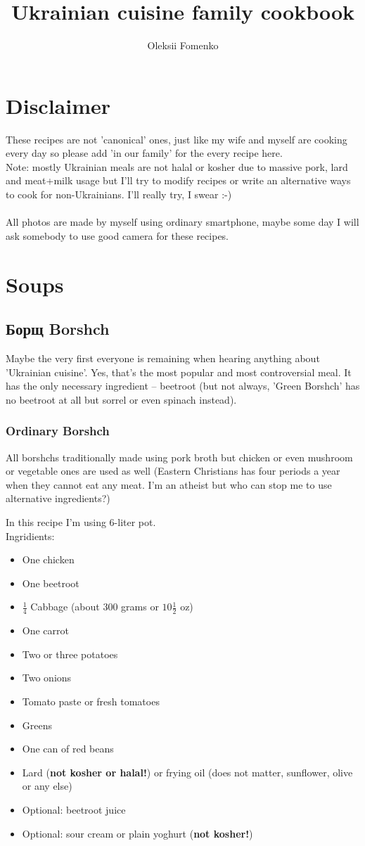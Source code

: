 \documentclass[11pt,a4paper]{article}
\title{\textbf{Ukrainian cuisine family cookbook}}
\author{Oleksii Fomenko}
\date{}
\begin{document}
\section*{Disclaimer}
These recipes are not 'canonical' ones, just like my wife and myself are cooking every day so please add 'in our family' for the every recipe here.
\\

Note: mostly Ukrainian meals are not halal or kosher due to massive pork, lard and meat+milk usage but I'll try to modify recipes or write an alternative ways to cook for non-Ukrainians. I'll really try, I swear :-)
\\
\\
All photos are made by myself using ordinary smartphone, maybe some day I will ask somebody to use good camera for these recipes.
\\

\section*{Soups}
\subsection*{Борщ Borshch \textipa{['bO:rS]}}
Maybe the very first everyone is remaining when hearing anything about 'Ukrainian cuisine'.
Yes, that's the most popular and most controversial meal. It has the only necessary ingredient -- beetroot (but not always, 'Green Borshch' has no beetroot at all but sorrel or even spinach instead).

\subsubsection*{Ordinary Borshch}
All borshchs traditionally made using pork broth but chicken or even mushroom or vegetable ones are used as well (Eastern Christians has four periods a year when they cannot eat any meat. I'm an atheist but who can stop me to use alternative ingredients?)

In this recipe I'm using 6-liter pot. \\

Ingridients:
\begin{itemize}
  \item One chicken
  \item One beetroot
  \item $\frac{1}{4}$ Cabbage (about 300 grams or $10\frac{1}{2}$ oz) 
  \item One carrot
  \item Two or three potatoes
  \item Two onions
  \item Tomato paste or fresh tomatoes
  \item Greens
  \item One can of red beans
  \item Lard (\textbf{not kosher or halal!}) or frying oil (does not matter, sunflower, olive or any else)
  \item Optional: beetroot juice
  \item Optional: sour cream or plain yoghurt (\textbf{not kosher!})
\end{itemize}
\end{document}
